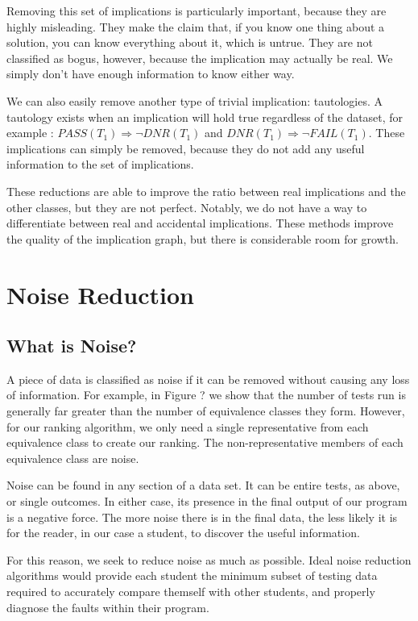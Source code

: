 \documentclass[11pt,twoside]{article}
\newcommand\dnr{\ensuremath{\mathit{DNR}}}
\newcommand\fail{\mathit{FAIL}}
\newcommand\pass{\mathit{PASS}}
\theoremstyle{definition}
\begin{document}
Removing this set of implications is particularly important, because they are highly misleading. They make the claim that, if you know one thing about a solution, you can know everything about it, which is untrue. They are not classified as bogus, however, because the implication may actually be real. We simply don't have enough information to know either way.

We can also easily remove another type of trivial implication: tautologies. A tautology exists when an implication will hold true regardless of the dataset, for example : $\pass(T_1) \Rightarrow \neg\dnr(T_1)$ and $\dnr(T_1) \Rightarrow \neg\fail(T_1)$. These implications can simply be removed, because they do not add any useful information to the set of implications.

These reductions are able to improve the ratio between real implications and the other classes, but they are not perfect. Notably, we do not have a way to differentiate between real and accidental implications. These methods improve the quality of the implication graph, but there is considerable room for growth.

\section{Noise Reduction}

\subsection{What is Noise?}
A piece of data is classified as noise if it can be removed without causing any loss of information. For example, in Figure {?} we show that the number of tests run is generally far greater than the number of equivalence classes they form. However, for our ranking algorithm, we only need a single representative from each equivalence class to create our ranking. The non-representative members of each equivalence class are noise. 

Noise can be found in any section of a data set. It can be entire tests, as above, or single outcomes. In either case, its presence in the final output of our program is a negative force. The more noise there is in the final data, the less likely it is for the reader, in our case a student, to discover the useful information.

For this reason, we seek to reduce noise as much as possible. Ideal noise reduction algorithms would provide each student the minimum subset of testing data required to accurately compare themself with other students, and properly diagnose the faults within their program.
\end{document}
